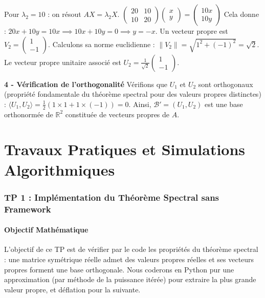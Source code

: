 \documentclass[11pt,a4paper]{article}
\begin{document}
Pour $\lambda_2 = 10$ : on résout $AX = \lambda_2 X$.
$\begin{pmatrix} 20 & 10 \\ 10 & 20 \end{pmatrix} \begin{pmatrix} x \\ y \end{pmatrix} = \begin{pmatrix} 10x \\ 10y \end{pmatrix}$
Cela donne :
$20x + 10y = 10x \implies 10x + 10y = 0 \implies y = -x$.
Un vecteur propre est $V_2 = \begin{pmatrix} 1 \\ -1 \end{pmatrix}$.
Calculons sa norme euclidienne : $\|V_2\| = \sqrt{1^2 + (-1)^2} = \sqrt{2}$.
Le vecteur propre unitaire associé est $U_2 = \frac{1}{\sqrt{2}} \begin{pmatrix} 1 \\ -1 \end{pmatrix}$.

\textbf{4 - Vérification de l'orthogonalité}
Vérifions que $U_1$ et $U_2$ sont orthogonaux (propriété fondamentale du théorème spectral pour des valeurs propres distinctes) :
$\langle U_1, U_2 \rangle = \frac{1}{2} (1 \times 1 + 1 \times (-1)) = 0$.
Ainsi, $\mathcal{B}' = (U_1, U_2)$ est une base orthonormée de $\mathbb{R}^2$ constituée de vecteurs propres de $A$.

\newpage


\part{Travaux Pratiques et Simulations Algorithmiques}
\section{TP 1 : Implémentation du Théorème Spectral sans Framework}

\subsection{Objectif Mathématique}
L'objectif de ce TP est de vérifier par le code les propriétés du théorème spectral : une matrice symétrique réelle admet des valeurs propres réelles et ses vecteurs propres forment une base orthogonale. Nous coderons en Python pur une approximation (par méthode de la puissance itérée) pour extraire la plus grande valeur propre, et déflation pour la suivante.
\end{document}
